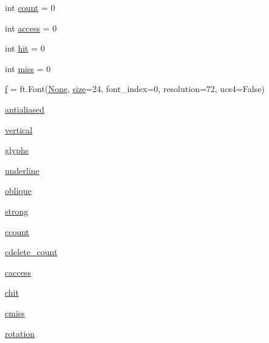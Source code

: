 \begin{DoxyCompactItemize}
$$int \hyperlink{namespacepygame_1_1tests_1_1freetype__test_a58ba81e511096dcf78bc663f24f34145}{count} = 0
\item 
int \hyperlink{namespacepygame_1_1tests_1_1freetype__test_a5bd76e26108ee3768722dac35e7b3e7f}{access} = 0
\item 
int \hyperlink{namespacepygame_1_1tests_1_1freetype__test_abfcd31071a9275da5b7d96e376d6a602}{hit} = 0
\item 
int \hyperlink{namespacepygame_1_1tests_1_1freetype__test_a255690f48846031bdae0f5a2edad7493}{miss} = 0
\item 
\hyperlink{namespacepygame_1_1tests_1_1freetype__test_a41e4b2a027fb6abd91a559fed87bb3c1}{f} = ft.\+Font(\hyperlink{namespacepygame_1_1tests_1_1freetype__test_a68ff732e0bcda8dbe10438d0b43cdcd2}{None}, \hyperlink{namespacepygame_1_1tests_1_1freetype__test_ad75d5e6258fdce7db138e01e9d36d7e3}{size}=24, font\+\_\+index=0, resolution=72, ucs4=False)
\item 
\hyperlink{namespacepygame_1_1tests_1_1freetype__test_a7749f86352712523dd8b760921873ff0}{antialiased}
\item 
\hyperlink{namespacepygame_1_1tests_1_1freetype__test_ad424f75155ab91f62670f7e7d7ef1d7a}{vertical}
\item 
\hyperlink{namespacepygame_1_1tests_1_1freetype__test_a65ec6de0d2c7044c6a2d9b6a49cbc7ac}{glyphs}
\item 
\hyperlink{namespacepygame_1_1tests_1_1freetype__test_ad5a2a4b31e1b0f14e234a03e974a8e20}{underline}
\item 
\hyperlink{namespacepygame_1_1tests_1_1freetype__test_af2f9e76d3fdbff613f8778e938c0d60f}{oblique}
\item 
\hyperlink{namespacepygame_1_1tests_1_1freetype__test_ad196e944c59111de97271842ac31bdf8}{strong}
\item 
\hyperlink{namespacepygame_1_1tests_1_1freetype__test_a8f8ba85f2aa38c7ec6fb6fa099c8c55d}{ccount}
\item 
\hyperlink{namespacepygame_1_1tests_1_1freetype__test_ac699f377e775e884ee0607f42f2366f7}{cdelete\+\_\+count}
\item 
\hyperlink{namespacepygame_1_1tests_1_1freetype__test_a2ad2d3da55b8616f207d8d0c322994e3}{caccess}
\item 
\hyperlink{namespacepygame_1_1tests_1_1freetype__test_acd12bc505448705e18c912c9817a9d22}{chit}
\item 
\hyperlink{namespacepygame_1_1tests_1_1freetype__test_a2cf9a0c3392bcc5a1027a8e0c1fafed8}{cmiss}
\item 
\hyperlink{namespacepygame_1_1tests_1_1freetype__test_ae6c39a84ea6a41b46c2e65dfdcd7cb18}{rotation}
\end{DoxyCompactItemize}


